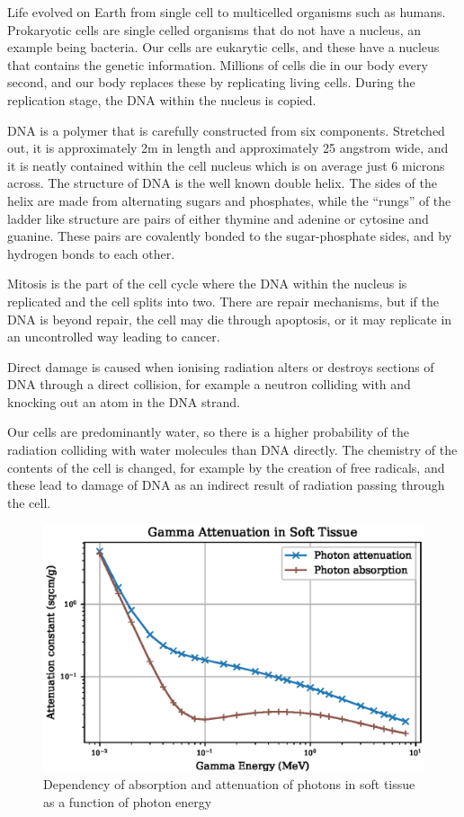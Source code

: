 Life evolved on Earth from single cell to multicelled organisms such as humans.  Prokaryotic cells are single celled organisms that do not have a nucleus, an example being bacteria.  Our cells are eukarytic cells, and these have a nucleus that contains the genetic information.  Millions of cells die in our body every second, and our body replaces these by replicating living cells.  During the replication stage, the DNA within the nucleus is copied.    

DNA is a polymer that is carefully constructed from six components.  Stretched out, it is approximately 2m in length and approximately 25 angstrom wide, and it is neatly contained within the cell nucleus which is on average just 6 microns across.  The structure of DNA is the well known double helix.  The sides of the helix are made from alternating sugars and phosphates, while the \enquote{rungs} of the ladder like structure are pairs of either thymine and adenine or cytosine and guanine.  These pairs are covalently bonded to the sugar-phosphate sides, and by hydrogen bonds to each other.

Mitosis is the part of the cell cycle where the DNA within the nucleus is replicated and the cell splits into two.  There are repair mechanisms, but if the DNA is beyond repair, the cell may die through apoptosis, or it may replicate in an uncontrolled way leading to cancer.

Direct damage is caused when ionising radiation alters or destroys sections of DNA through a direct collision, for example a neutron colliding with and knocking out an atom in the DNA strand.

Our cells are predominantly water, so there is a higher probability of the radiation colliding with water molecules than DNA directly.  The chemistry of the contents of the cell is changed, for example by the creation of free radicals, and these lead to damage of DNA as an indirect result of radiation passing through the cell.

\begin{figure}[htb]
\centering
\includegraphics[width=0.5\linewidth]{chapters/consequences_of_ionizing_radiation/tissue/soft_tissue_gamma_attenuation.eps}
\caption{Dependency of absorption and attenuation of photons in soft tissue as a function of photon energy}
\label{fig:softtissueattenuation}
\end{figure}

